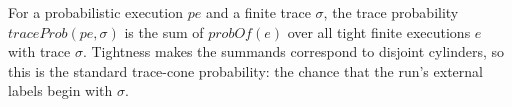 \begin{definition}
  \label{def:traceprob}
  \leanok
  For a probabilistic execution $pe$ and a finite trace $\sigma$, the trace
  probability $traceProb(pe, \sigma)$ is the sum of $probOf(e)$ over all tight
  finite executions $e$ with trace $\sigma$. Tightness makes the summands
  correspond to disjoint cylinders, so this is the standard trace-cone
  probability: the chance that the run's external labels begin with $\sigma$.
\end{definition}
